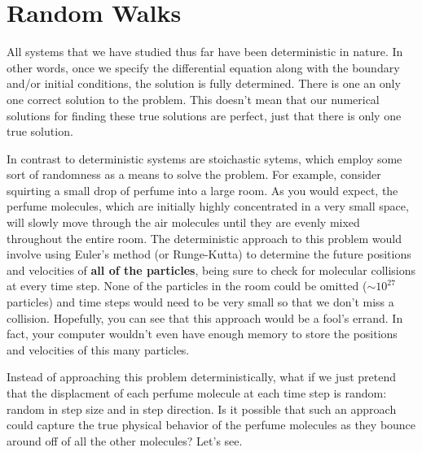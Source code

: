 \chapter{Random Walks}
\label{Lab:20}

All systems that we have studied thus far have been deterministic in
nature.  In other words, once we specify the differential equation
along with the boundary and/or initial conditions, the solution is
fully determined.  There is one an only one correct solution to the
problem.  This doesn't mean that our numerical solutions for finding
these true solutions are perfect, just that there is only one true
solution.

In contrast to deterministic systems are stoichastic sytems, which
employ some sort of randomness as a means to solve the problem.  For
example, consider squirting a small drop of perfume into a large room.
As you would expect, the perfume molecules, which are initially
highly concentrated in a very small space, will slowly move through the air
molecules until they are evenly mixed throughout the entire room. The
deterministic approach to this problem would involve using Euler's
method (or Runge-Kutta) to determine the future positions and
velocities of \textbf{all of the particles}, being sure to check for
molecular collisions at every time step. None of the particles in the
room could be omitted ($\sim 10^{27}$ particles) and time steps would
need to be very small so that we don't miss a collision.  Hopefully,
you can see that this approach would be a fool's errand. In fact, your
computer wouldn't even have enough memory to store the positions and
velocities of this many particles.

Instead of approaching this problem deterministically, what if we just
pretend that the displacment of each perfume molecule at each time
step is random: random in step size and in step direction. Is it
possible that such an approach could capture the true physical behavior of
the perfume molecules as they bounce around off of all the other
molecules?  Let's see.






